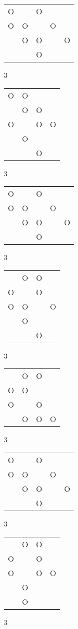 \begin{tabular}{|m{0.2cm}m{0.2cm}m{0.2cm}m{0.2cm}m{0.2cm}|}\hline
O& &O& & \\
O&O& &O& \\
 &O&O& &O\\
 & &O& & \\
\hline\end{tabular}3
\begin{tabular}{|m{0.2cm}m{0.2cm}m{0.2cm}m{0.2cm}|}\hline
O&O& & \\
 &O&O& \\
O& &O&O\\
 &O& & \\
 & &O& \\
\hline\end{tabular}3
\begin{tabular}{|m{0.2cm}m{0.2cm}m{0.2cm}m{0.2cm}m{0.2cm}|}\hline
O& &O& & \\
O&O& &O& \\
 &O&O& &O\\
 & &O& & \\
\hline\end{tabular}3
\begin{tabular}{|m{0.2cm}m{0.2cm}m{0.2cm}m{0.2cm}|}\hline
 &O&O& \\
O& &O& \\
O&O& &O\\
 &O& & \\
 & &O& \\
\hline\end{tabular}3
\begin{tabular}{|m{0.2cm}m{0.2cm}m{0.2cm}m{0.2cm}|}\hline
 &O&O& \\
O&O& & \\
O& &O& \\
 &O&O&O\\
\hline\end{tabular}3
\begin{tabular}{|m{0.2cm}m{0.2cm}m{0.2cm}m{0.2cm}m{0.2cm}|}\hline
O& &O& & \\
O&O& &O& \\
 &O&O& &O\\
 & &O& & \\
\hline\end{tabular}3
\begin{tabular}{|m{0.2cm}m{0.2cm}m{0.2cm}m{0.2cm}|}\hline
 &O&O& \\
O& &O& \\
O& &O&O\\
 &O& & \\
 &O& & \\
\hline\end{tabular}3
